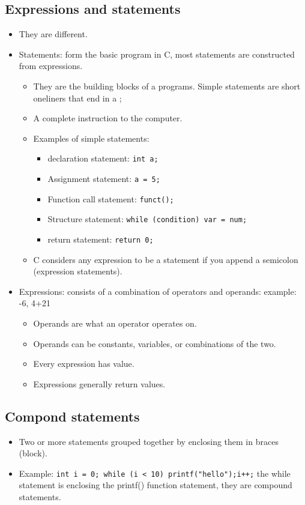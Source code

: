 \subsection{Expressions and statements}
\begin{itemize}
    \item They are different. 
    \item Statements: form the basic program in C, most statements are constructed from expressions. 
        \begin{itemize}
            \item They are the building blocks of a programs. Simple statements are short oneliners that end in a ; 
            \item A complete instruction to the computer.
            \item Examples of simple statements: 
                \begin{itemize}
                    \item declaration statement: \texttt{int a;}
                    \item Assignment statement: \texttt{a = 5;}
                    \item Function call statement: \texttt{funct();}
                    \item Structure statement: \texttt{while (condition) var = num;}
                    \item return statement: \texttt{return 0;}
                \end{itemize}
            \item C considers any expression to be a statement if you append a semicolon (expression statements).
        \end{itemize}
    \item Expressions: consists of a combination of operators and operands: example: -6, 4+21
        \begin{itemize}
            \item Operands are what an operator operates on. 
            \item Operands can be constants, variables, or combinations of the two.
            \item Every expression has value. 
            \item Expressions generally return values. 
        \end{itemize}
\end{itemize}
\subsection{Compond statements}
\begin{itemize}
    \item Two or more statements grouped together by enclosing them in braces (block).
    \item Example: \texttt{int i = 0; while (i < 10) {printf("hello");i++;}} the while statement is enclosing the printf() function statement, they are compound statements. 
\end{itemize}


